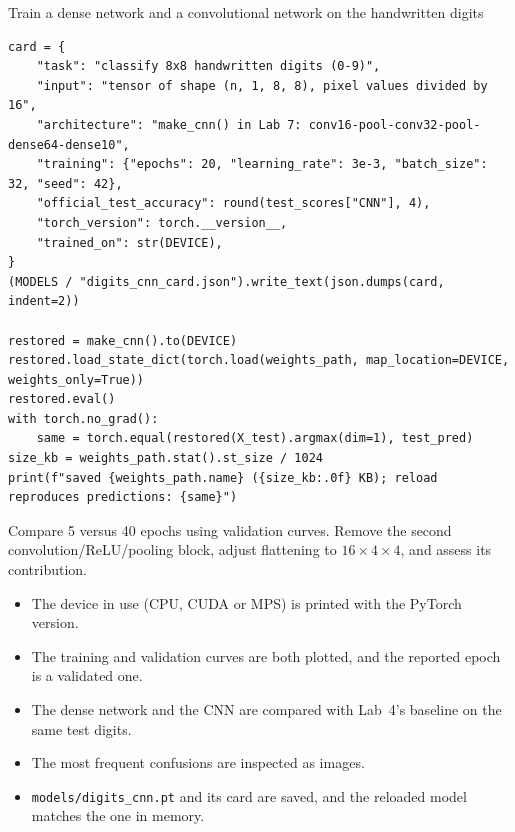 \begin{labproject}{Train a dense network and a convolutional network on the handwritten digits}
\begin{lstlisting}[style=utppython]
card = {
    "task": "classify 8x8 handwritten digits (0-9)",
    "input": "tensor of shape (n, 1, 8, 8), pixel values divided by 16",
    "architecture": "make_cnn() in Lab 7: conv16-pool-conv32-pool-dense64-dense10",
    "training": {"epochs": 20, "learning_rate": 3e-3, "batch_size": 32, "seed": 42},
    "official_test_accuracy": round(test_scores["CNN"], 4),
    "torch_version": torch.__version__,
    "trained_on": str(DEVICE),
}
(MODELS / "digits_cnn_card.json").write_text(json.dumps(card, indent=2))

restored = make_cnn().to(DEVICE)
restored.load_state_dict(torch.load(weights_path, map_location=DEVICE, weights_only=True))
restored.eval()
with torch.no_grad():
    same = torch.equal(restored(X_test).argmax(dim=1), test_pred)
size_kb = weights_path.stat().st_size / 1024
print(f"saved {weights_path.name} ({size_kb:.0f} KB); reload reproduces predictions: {same}")
\end{lstlisting}

\begin{tryit}
Compare 5 versus 40 epochs using validation curves. Remove the second convolution/ReLU/pooling block, adjust flattening to $16\times4\times4$, and assess its contribution.
\end{tryit}
\end{labproject}

\begin{verification}
\begin{itemize}
  \item The device in use (CPU, CUDA or MPS) is printed with the PyTorch version.
  \item The training and validation curves are both plotted, and the reported epoch is a validated one.
  \item The dense network and the CNN are compared with Lab~4's baseline on the same test digits.
  \item The most frequent confusions are inspected as images.
  \item \texttt{models/digits\_cnn.pt} and its card are saved, and the reloaded model matches the one in memory.
\end{itemize}
\end{verification}
